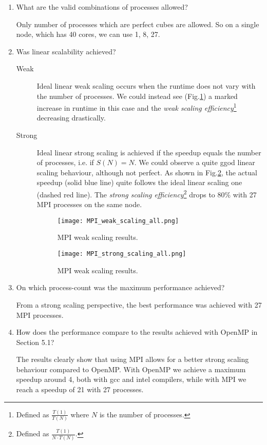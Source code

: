 \documentclass{article}
\begin{document}
\begin{enumerate}
	\item{What are the valid combinations of processes allowed?

	Only number of processes which are perfect cubes are allowed. So on a single node, which has 40 cores, we can use 1, 8, 27.
	}

	\item Was linear scalability achieved?

	\begin{description}
		\item[Weak]	 Ideal linear weak scaling occurs when the runtime does not vary with the number of processes. We could instead see (Fig.\ref{fig:MPI_weakScaling}) a marked increase in runtime in this case and the \emph{weak scaling efficiency}\footnote{Defined as $\frac{T(1)}{T(N)}$ where $N$ is the number of processes.} decreasing drastically.

		\item[Strong] Ideal linear strong scaling is achieved if the speedup equals the number of processes, i.e. if $S(N) = N$. We could observe a quite ggod linear scaling behaviour, although not perfect. As shown in Fig.\ref{fig:MPI_strongScaling}, the actual speedup (solid blue line) quite follows the ideal linear scaling one (dashed red line). The \emph{strong scaling efficiency}\footnote{Defined as $\frac{T(1)}{N \cdot T(N)}$.} drops to $80\%$ with 27 MPI processes on the same node.

		\begin{figure}[p] %
		 	\begin{center}
		 		\texttt{[image: MPI\_weak\_scaling\_all.png]} %
		 		\caption{MPI weak scaling results.}
		 		\label{fig:MPI_weakScaling}
		 	\end{center}
		\end{figure}
		\begin{figure}[p] %
		 	\begin{center}
		 		\texttt{[image: MPI\_strong\_scaling\_all.png]} %
		 		\caption{MPI weak scaling results.}
		 		\label{fig:MPI_strongScaling}
		 	\end{center}
		\end{figure}
	\end{description}

	\item On which process-count was the maximum performance achieved?

	From a strong scaling perspective, the best performance was achieved with 27 MPI processes.

	\item How does the performance compare to the results achieved with OpenMP in Section 5.1?

	The results clearly show that using MPI allows for a better strong scaling behaviour compared to OpenMP. With OpenMP we achieve a maximum speedup around 4, both with gcc and intel compilers, while with MPI we reach a speedup of 21 with 27 processes.

\end{enumerate}
\end{document}
